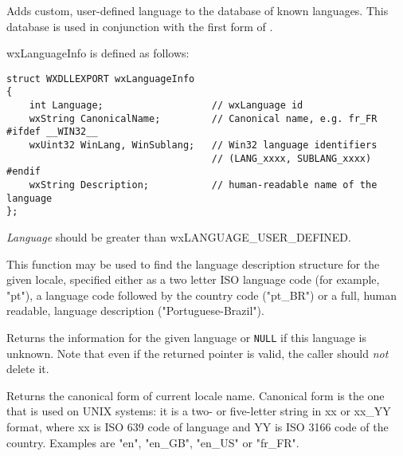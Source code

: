 
Adds custom, user-defined language to the database of known languages. This
database is used in conjunction with the first form of 
. 

wxLanguageInfo is defined as follows:

\begin{verbatim}
struct WXDLLEXPORT wxLanguageInfo
{
    int Language;                   // wxLanguage id
    wxString CanonicalName;         // Canonical name, e.g. fr_FR
#ifdef __WIN32__
    wxUint32 WinLang, WinSublang;   // Win32 language identifiers
                                    // (LANG_xxxx, SUBLANG_xxxx)
#endif
    wxString Description;           // human-readable name of the language
};
\end{verbatim}


{\it Language} should be greater than wxLANGUAGE\_USER\_DEFINED.



\label{wxlocalefindlanguageinfo}


This function may be used to find the language description structure for the
given locale, specified either as a two letter ISO language code (for example,
"pt"), a language code followed by the country code ("pt\_BR") or a full, human
readable, language description ("Portuguese-Brazil").

Returns the information for the given language or {\tt NULL} if this language
is unknown. Note that even if the returned pointer is valid, the caller should
{\it not} delete it.




\label{wxlocalegetcanonicalname}


Returns the canonical form of current locale name. Canonical form is the
one that is used on UNIX systems: it is a two- or five-letter string in xx or
xx\_YY format, where xx is ISO 639 code of language and YY is ISO 3166 code of
the country. Examples are "en", "en\_GB", "en\_US" or "fr\_FR".


